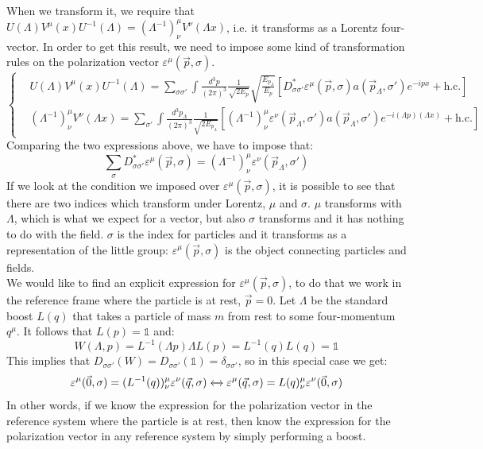 \documentclass[../main.tex]{subfiles}
\begin{document}
When we transform it, we require that $U(\Lambda)V^\mu(x)U^{-1}(\Lambda)=(\Lambda^{-1})^\mu_\nu V^\nu(\Lambda x)$, i.e. it transforms as a Lorentz four-vector. In order to get this result, we need to impose some kind of transformation rules on the polarization vector $\varepsilon^\mu(\vec{p},\sigma)$.
\[
\left\{
\begin{aligned}
&U(\Lambda)V^\mu(x)U^{-1}(\Lambda)=\sum_{\sigma\sigma'}\int\frac{d^3p}{(2\pi)^3}\frac{1}{\sqrt{2E_p}}\sqrt{\frac{E_{p_\Lambda}}{E_p}}\left[D_{\sigma\sigma'}^*\varepsilon^\mu(\vec{p},\sigma)a(\vec{p}_\Lambda,\sigma')e^{-ipx}+\text{h.c.}\right]\\
&(\Lambda^{-1})^\mu_\nu V^\nu(\Lambda x)=\sum_{\sigma'}\int\frac{d^3p_\Lambda}{(2\pi)^3}\frac{1}{\sqrt{2E_{p_\Lambda}}}[(\Lambda^{-1})^\mu_\nu\varepsilon^\nu(\Vec{p}_\Lambda,\sigma')a(\Vec{p}_\Lambda,\sigma')e^{-i(\Lambda p)(\Lambda x)}+\text{h.c.}]
\end{aligned}
\right.
\]
Comparing the two expressions above, we have to impose that:
\[
\sum_\sigma D_{\sigma\sigma'}^*\varepsilon^\mu(\vec{p},\sigma)=(\Lambda^{-1})^\mu_\nu\varepsilon^\nu(\vec{p}_\Lambda,\sigma')
\]
If we look at the condition we imposed over $\varepsilon^\mu(\vec{p},\sigma)$, it is possible to see that there are two indices which transform under Lorentz, $\mu$ and $\sigma$. $\mu$ transforms with $\Lambda$, which is what we expect for a vector, but also $\sigma$ transforms and it has nothing to do with the field. $\sigma$ is the index for particles and it transforms as a representation of the little group: $\varepsilon^\mu(\vec{p},\sigma)$ is the object connecting particles and fields.\\
We would like to find an explicit expression for $\varepsilon^\mu(\vec{p},\sigma)$, to do that we work in the reference frame where the particle is at rest, $\Vec{p}=0$. Let $\Lambda$ be the standard boost $L(q)$ that takes a particle of mass $m$ from rest to some four-momentum $q^\mu$. It follows that $L(p)=\mathbb{1}$ and:
\[
W(\Lambda,p)=L^{-1}(\Lambda p)\Lambda L(p)=L^{-1}(q)L(q)=\mathbb{1}
\]
This implies that $D_{\sigma\sigma'}(W)=D_{\sigma\sigma'}(\mathbb{1})=\delta_{\sigma\sigma'}$, so in this special case we get:
\[
\varepsilon^\mu(\Vec{0},\sigma)=(L^{-1}(q))^\mu_\nu\varepsilon^\nu(\vec{q},\sigma)\xleftrightarrow[]{}\varepsilon^\mu(\vec{q},\sigma)=L(q)^\mu_\nu\varepsilon^\nu(\Vec{0},\sigma)
\]
In other words, if we know the expression for the polarization vector in the reference system where the particle is at rest, then know the expression for the polarization vector in any reference system by simply performing a boost.\\
\end{document}
